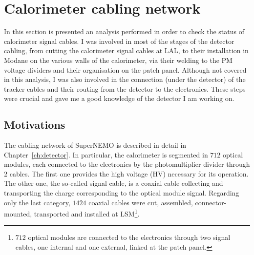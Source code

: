 \section{Calorimeter cabling network}
\label{sec:reflecto}

In this section is presented an analysis performed in order to check the status of calorimeter signal cables.
I was involved in most of the stages of the detector cabling, from cutting the calorimeter signal cables at LAL, to their installation in Modane on the various walls of the calorimeter, via their welding to the PM voltage dividers and their organisation on the patch panel.
Although not covered in this analysis, I was also involved in the connection (under the detector) of the tracker cables and their routing from the detector to the electronics.
These steps were crucial and gave me a good knowledge of the detector I am working on.

\subsection{Motivations}

The cabling network of SuperNEMO is described in detail in Chapter~\ref{ch:detector}.
In particular, the calorimeter is segmented in $712$ optical modules, each connected to the electronics by the photomultiplier divider through $2$ cables.
The first one provides the high voltage (HV) necessary for its operation.
The other one, the so-called signal cable, is a coaxial cable collecting and transporting the charge corresponding to the optical module signal.
Regarding only the last category, $1424$ coaxial cables were cut, assembled, connector-mounted, transported and installed at LSM\footnote{$712$ optical modules are connected to the electronics through two signal cables, one internal and one external, linked at the patch panel.}.

